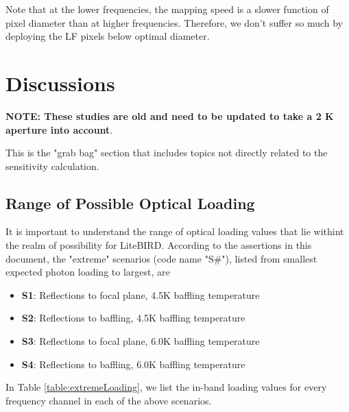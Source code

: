 \documentclass[12pt, titlepage]{article} %
\begin{document}
Note that at the lower frequencies, the mapping speed is a slower function of pixel diameter than at higher frequencies. Therefore, we don't suffer so much by deploying the LF pixels below optimal diameter.



\newpage

\section{Discussions}

\textbf{NOTE: These studies are old and need to be updated to take a 2 K aperture into account}.

This is the "grab bag" section that includes topics not directly related to the sensitivity calculation.


\subsection{Range of Possible Optical Loading \label{sec:possibleLoadings}}

It is important to understand the range of optical loading values that lie withint the realm of possibility for LiteBIRD. According to the assertions in this document, the "extreme" scenarios (code name "S\#"), listed from smallest expected photon loading to largest, are

\begin{itemize}
	\item[] \textbf{S1}: Reflections to focal plane, 4.5K baffling temperature
	\item[] \textbf{S2}: Reflections to baffling, 4.5K baffling temperature
	\item[] \textbf{S3}: Reflections to focal plane, 6.0K baffling temperature	
	\item[] \textbf{S4}: Reflections to baffling, 6.0K baffling temperature
\end{itemize}

In Table \ref{table:extremeLoading}, we list the in-band loading values for every frequency channel in each of the above scenarios.
\end{document}

